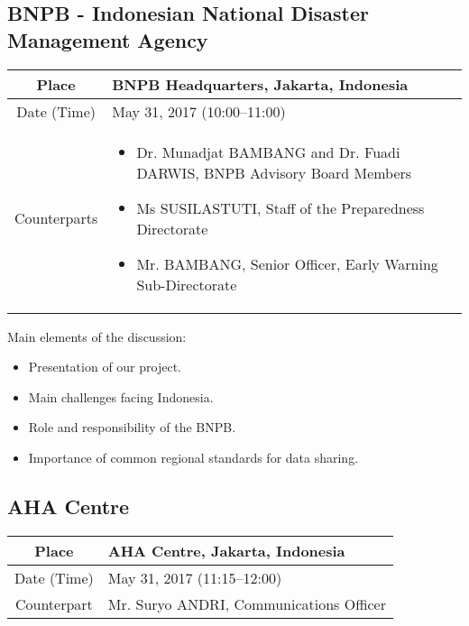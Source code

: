 \subsection{BNPB - Indonesian National Disaster Management Agency}

\begin{table}[H]
   \centering
   \begin{tabular}{| c | p{12 cm} |}
   \hline
    Place & BNPB Headquarters, Jakarta, Indonesia \\ \hline
    Date (Time) & May 31, 2017 (10:00--11:00) \\ \hline
    Counterparts & \begin{itemize} \item Dr. Munadjat BAMBANG and Dr. Fuadi DARWIS, BNPB Advisory Board Members \item Ms SUSILASTUTI, Staff of the Preparedness Directorate \item Mr. BAMBANG, Senior Officer, Early Warning Sub-Directorate \end{itemize} \\ \hline   
   \end{tabular}
\end{table}

Main elements of the discussion:

\begin{itemize}

\item Presentation of our project.

\item Main challenges facing Indonesia.

\item Role and responsibility of the BNPB.

\item Importance of common regional standards for data sharing.

\end{itemize}


\subsection{AHA Centre}

\begin{table}[H]
   \centering
   \begin{tabular}{| c | p{12 cm} |}
   \hline
    Place & AHA Centre, Jakarta, Indonesia \\ \hline
    Date (Time) & May 31, 2017 (11:15--12:00) \\ \hline
    Counterpart & Mr. Suryo ANDRI, Communications Officer \\ \hline   
   \end{tabular}
\end{table}

